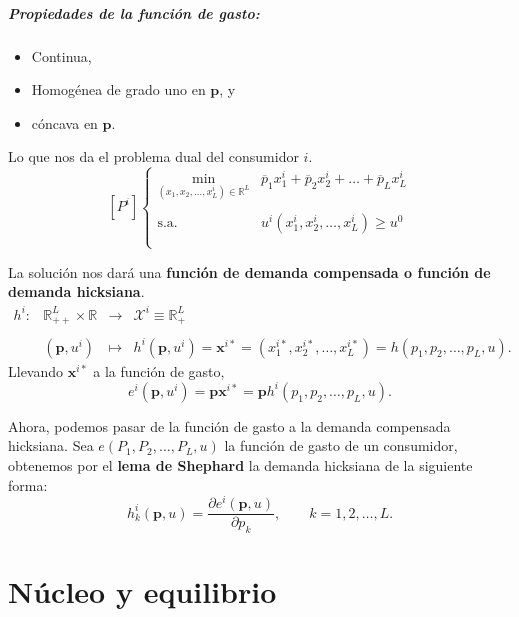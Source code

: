 \paragraph{Propiedades de la función de gasto:}

\begin{itemize}
    \item Continua,
    \item Homogénea de grado uno en $\textbf{p}$, y
    \item cóncava en $\textbf{p}$.
\end{itemize}

Lo que nos da el problema dual del consumidor $i$.
$$
\left[P^i\right]
\left\{
    \begin{array}{rl}
	\min_{\left(x_1,x_2,\ldots,x_L^i\right) \in \mathbb{R}^L} & \overline{p}_1x_1^i+\overline{p}_2x_2^i+\ldots+\overline{p}_Lx_L^i\\\\
	\text{s.a. } & u^i\left(x_1^i,x_2^i,\ldots,x_L^i\right) \geq u^0\\\\
    \end{array}
\right.
$$

La solución nos dará una \textbf{función de demanda compensada o función de demanda hicksiana}.
$$
\begin{array}{rrcl}
    h^i: & \mathbb{R}_{++}^L \times \mathbb{R} & \to & \mathcal{X}^i\equiv \mathbb{R}_{+}^L\\\\
	 & \left(\textbf{p},u^i\right) & \mapsto & h^i\left(\textbf{p},u^i\right) = \textbf{x}^{i*}= \left(x_1^{i*},x_2^{i*},\ldots,x_L^{i*}\right)=h\left(p_1,p_2,\ldots,p_L,u\right).
\end{array}
$$
Llevando $\textbf{x}^{i*}$ a la función de gasto,
$$e^i\left(\textbf{p},u^i\right) = \textbf{px}^{i*} = \textbf{p}h^i\left(p_1,p_2,\ldots,p_L,u\right).$$

Ahora, podemos pasar de la función de gasto a la demanda compensada hicksiana. Sea $e\left(P_1,P_2,\ldots,P_L,u\right)$ la función de gasto de un consumidor, obtenemos por el \textbf{lema de Shephard} la demanda hicksiana de la siguiente forma:
$$h_k^i \left(\textbf{p},u\right) = \dfrac{\partial e^i\left(\textbf{p},u\right)}{\partial p_k}, \qquad k=1,2,\ldots,L.$$



\chapter{Núcleo y equilibrio}

